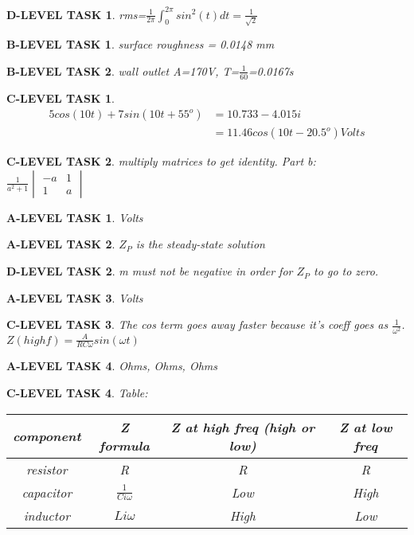 \documentclass{book}
\numberwithin{equation}{section}
\newtheorem{alevel}{A-LEVEL TASK}
\newtheorem{blevel}{B-LEVEL TASK}
\newtheorem{clevel}{C-LEVEL TASK}
\newtheorem{dlevel}{D-LEVEL TASK}
\theoremstyle{definition}
\begin{document}
\begin{dlevel}rms=$\frac{1}{2\pi}\int_0^{2\pi}{sin^2(t)dt}=\frac{1}{\sqrt{2}}$\end{dlevel}
\begin{blevel}surface roughness = 0.0148 mm\end{blevel}
\begin{blevel}wall outlet A=170V, T=$\frac{1}{60}$=0.0167s\end{blevel}
\begin{clevel}\begin{align*}5cos(10t)+7sin(10t+55^o)&=10.733-4.015i\\
	&=11.46cos(10t-20.5^o) Volts\end{align*}\end{clevel}
\begin{clevel}multiply matrices to get identity. Part b:\\
$\frac{1}{a^2+1}\begin{vmatrix}-a&1\\1&a \end{vmatrix}$\end{clevel}
\begin{alevel}Volts\end{alevel}
\begin{alevel}$Z_P$ is the steady-state solution\end{alevel}
\begin{dlevel}m must not be negative in order for $Z_P$ to go to zero.\end{dlevel}
\begin{alevel}Volts\end{alevel}
\begin{clevel}The cos term goes away faster because it's coeff goes as $\frac{1}{\omega^2}$.\\
$Z(high f)=\frac{A}{RC\omega}sin(\omega t)$\end{clevel}
\begin{alevel}Ohms, Ohms, Ohms\end{alevel}
\begin{clevel} Table:\par
\begin{table}[H]
\begin{tabular}{|c|c|c|c|} \hline
component&Z formula&Z at high freq (high or low)& Z at low freq\\ \hline
resistor&R&R&R \\ \hline
capacitor&$\frac{1}{Ci\omega}$&Low&High \\ \hline
inductor&$Li\omega$&High&Low  \\ \hline
\end{tabular}
\end{table}
\end{clevel}
\end{document}
